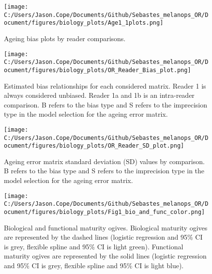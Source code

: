 \documentclass[11pt,
  letterpaper,
]{article}
\begin{document}
\clearpage

\begin{figure}
{\centering
\texttt{[image: C:/Users/Jason.Cope/Documents/Github/Sebastes\_melanops\_OR/Document/figures/biology\_plots/Age1\_1plots.png]}
}
\caption{Ageing bias plots by reader comparisons.\label{fig:age1-plot}}
\end{figure}

\newpage

\begin{figure}
{\centering
\texttt{[image: C:/Users/Jason.Cope/Documents/Github/Sebastes\_melanops\_OR/Document/figures/biology\_plots/OR\_Reader\_Bias\_plot.png]}
}
\caption{Estimated bias relationships for each considered matrix. Reader 1 is always considered unbiased. Reader 1a and 1b is an intra-reader comparison. B refers to the bias type and S refers to the imprecision type in the model selection for the ageing error matrix.\label{fig:age-error-bias}}
\end{figure}

\newpage

\begin{figure}
{\centering
\texttt{[image: C:/Users/Jason.Cope/Documents/Github/Sebastes\_melanops\_OR/Document/figures/biology\_plots/OR\_Reader\_SD\_plot.png]}
}
\caption{Ageing error matrix standard deviation (SD) values by comparison. B refers to the bias type and S refers to the imprecision type in the model selection for the ageing error matrix.\label{fig:age-error-sd}}
\end{figure}

\newpage

\begin{figure}
{\centering
\texttt{[image: C:/Users/Jason.Cope/Documents/Github/Sebastes\_melanops\_OR/Document/figures/biology\_plots/Fig1\_bio\_and\_func\_color.png]}
}
\caption{Biological and functional maturity ogives. Biological maturity ogives are represented by the dashed lines (logistic regression and 95\% CI is grey, flexible spline and 95\% CI is light green). Functional maturity ogives are represented by the solid lines (logistic regression and 95\% CI is grey, flexible spline and 95\% CI is light blue).\label{fig:bio-fxn-mat-color}}
\end{figure}
\end{document}
